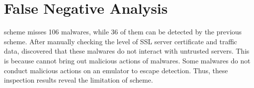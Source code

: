 \afterpage{\clearpage}
\newpage

\section{False Negative Analysis} 
\Our scheme misses 106 malwares, while 36 of them can be detected by the previous scheme.
After manually checking the level of SSL server certificate and traffic data, \we discovered that these malwares do not interact with untrusted servers.
This is because \we cannot bring out malicious actions of malwares.
Some malwares do not conduct malicious actions on an emulator to escape detection.
Thus, these inspection results reveal the limitation of \our scheme. 

